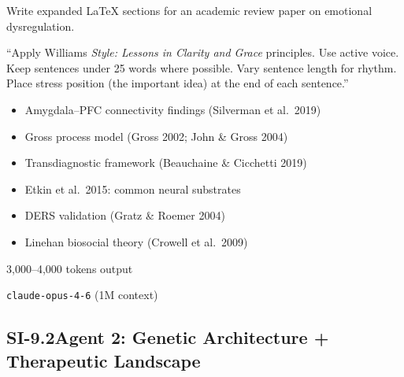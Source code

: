 \begin{description}[style=nextline, nosep]
  \item[Assignment]
    Write expanded \LaTeX{} sections for an academic review paper on emotional
    dysregulation.
  \item[Key directive]
    ``Apply Williams \emph{Style: Lessons in Clarity and Grace} principles.
    Use active voice.  Keep sentences under 25 words where possible.  Vary
    sentence length for rhythm.  Place stress position (the important idea) at
    the end of each sentence.''
  \item[Evidence provided]
    \begin{itemize}[nosep]
      \item Amygdala--PFC connectivity findings (Silverman et al.\ 2019)
      \item Gross process model (Gross 2002; John \& Gross 2004)
      \item Transdiagnostic framework (Beauchaine \& Cicchetti 2019)
      \item Etkin et al.\ 2015: common neural substrates
      \item DERS validation (Gratz \& Roemer 2004)
      \item Linehan biosocial theory (Crowell et al.\ 2009)
    \end{itemize}
  \item[Approximate token budget] 3,000--4,000 tokens output
  \item[Model] \texttt{claude-opus-4-6} (1M context)
\end{description}

\subsection*{SI-9.2\quad Agent 2: Genetic Architecture + Therapeutic Landscape}

